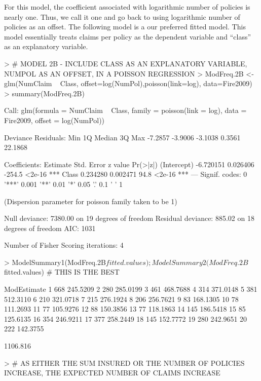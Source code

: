 \documentclass[12pt,letterpaper]{article}
\begin{document}
For this model, the coefficient associated with logarithmic number of policies is nearly one.
Thus, we call it one and go back to using logarithmic number of policies as an offset.
The following model is a our preferred fitted model.
This model essentially treats claims per policy as the dependent variable and 
``class'' as an explanatory variable.


\begin{Schunk}
\begin{Sinput}
> #  MODEL 2B - INCLUDE CLASS AS AN EXPLANATORY VARIABLE, NUMPOL AS AN OFFSET, IN A POISSON REGRESSION
> ModFreq.2B <- glm(NumClaim ~ Class, offset=log(NumPol),poisson(link=log), data=Fire2009)
> summary(ModFreq.2B)
\end{Sinput}
\begin{Soutput}
Call:
glm(formula = NumClaim ~ Class, family = poisson(link = log), 
    data = Fire2009, offset = log(NumPol))

Deviance Residuals: 
    Min       1Q   Median       3Q      Max  
-7.2857  -3.9006  -3.1038   0.3561  22.1868  

Coefficients:
             Estimate Std. Error z value Pr(>|z|)    
(Intercept) -6.720151   0.026406  -254.5   <2e-16 ***
Class        0.234280   0.002471    94.8   <2e-16 ***
---
Signif. codes:  0 '***' 0.001 '**' 0.01 '*' 0.05 '.' 0.1 ' ' 1

(Dispersion parameter for poisson family taken to be 1)

    Null deviance: 7380.00  on 19  degrees of freedom
Residual deviance:  885.02  on 18  degrees of freedom
AIC: 1031

Number of Fisher Scoring iterations: 4
\end{Soutput}
\begin{Sinput}
> ModelSummary1(ModFreq.2B$fitted.values);ModelSummary2(ModFreq.2B$fitted.values) #  THIS IS THE BEST
\end{Sinput}
\begin{Soutput}
       ModEstimate
1  668    245.5209
2  280    285.0199
3  461    468.7688
4  314    371.0148
5  381    512.3110
6  210    321.0718
7  215    276.1924
8  206    256.7621
9   83    168.1305
10  78    111.2693
11  77    105.9276
12  88    150.3856
13  77    118.1863
14 145    186.5418
15  85    125.6135
16 354    246.9211
17 377    258.2449
18 145    152.7772
19 280    242.9651
20 222    142.3755
\end{Soutput}
\begin{Soutput}
[1] 1106.816
\end{Soutput}
\begin{Sinput}
> #  AS EITHER THE SUM INSURED OR THE NUMBER OF POLICIES INCREASE, THE EXPECTED NUMBER OF CLAIMS INCREASE
\end{Sinput}
\end{Schunk}
\end{document}
